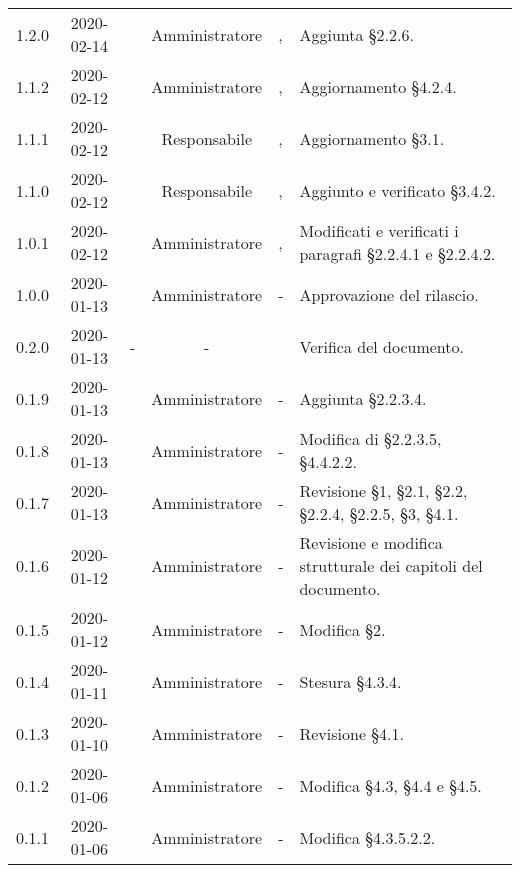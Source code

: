 {\begin{longtable}{ c c  C{2.3cm} c C{3cm} C{3.2cm}}
1.2.0 & 2020-02-14 & \SE{} & Amministratore & \CE{}, \MC{} & Aggiunta §2.2.6. \\

1.1.2 & 2020-02-12 & \SE{} & Amministratore & \CE{}, \MC{} & Aggiornamento §4.2.4. \\ 

1.1.1 & 2020-02-12 & \BR{} & Responsabile & \CE{}, \MC{} & Aggiornamento §3.1. \\ 

1.1.0 & 2020-02-12 & \BR{} & Responsabile & \CE{}, \MC{} & Aggiunto e verificato §3.4.2. \\

1.0.1 & 2020-02-12 & \SE{} & Amministratore & \CE{}, \MC{} & Modificati e verificati i paragrafi §2.2.4.1 e §2.2.4.2. \\ 

1.0.0 & 2020-01-13 & \AT{} & Amministratore & - & Approvazione del  rilascio.  \\

0.2.0 & 2020-01-13 & - & - & \PF{} & Verifica del documento.  \\ 

0.1.9 & 2020-01-13 & \CE{} & Amministratore & - & Aggiunta §2.2.3.4. \\

0.1.8 & 2020-01-13 & \BR{} & Amministratore & - & Modifica di §2.2.3.5, §4.4.2.2. \\

0.1.7 & 2020-01-13 & \AT{} & Amministratore & - & Revisione §1, §2.1, §2.2, §2.2.4, §2.2.5, §3, §4.1. \\

0.1.6 & 2020-01-12 & \MC{} & Amministratore & - & Revisione e modifica strutturale dei capitoli del documento. \\

0.1.5 & 2020-01-12 & \AT{} & Amministratore & - & Modifica §2. \\

0.1.4 & 2020-01-11 & \MC{} & Amministratore & - & Stesura §4.3.4. \\

0.1.3 & 2020-01-10 & \MC{} & Amministratore & - & Revisione §4.1. \\

0.1.2 & 2020-01-06 & \AT{} & Amministratore & - & Modifica §4.3, §4.4 e §4.5. \\

0.1.1 & 2020-01-06 & \AT{} & Amministratore & - & Modifica §4.3.5.2.2. \\


\end{longtable}}
